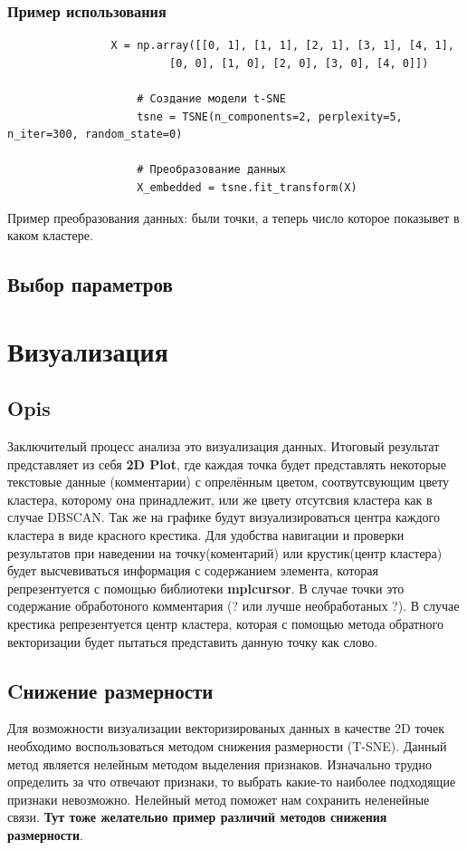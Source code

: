 		\subsubsection{Пример использования}
			\begin{verbatim}
				X = np.array([[0, 1], [1, 1], [2, 1], [3, 1], [4, 1],
             			 [0, 0], [1, 0], [2, 0], [3, 0], [4, 0]])

					# Создание модели t-SNE
					tsne = TSNE(n_components=2, perplexity=5, n_iter=300, random_state=0)

					# Преобразование данных
					X_embedded = tsne.fit_transform(X)
			\end{verbatim}
			
			
			Пример преобразования данных:
				были точки, а теперь число которое показывет в каком кластере.
		
	\subsection{Выбор параметров}
			
	
	
\section{Визуализация}
	\subsection{Opis}
		Заключителый процесс анализа это визуализация данных. Итоговый результат представляет из себя \textbf{2D Plot}, где каждая точка будет представлять некоторые текстовые данные (комментарии) с опрелённым цветом, соотвутсвующим цвету кластера, которому она принадлежит, или же цвету отсутсвия кластера как в случае DBSCAN. Так же на графике будут визуализироваться центра каждого кластера в виде красного крестика. Для удобства навигации и проверки результатов  при наведении на точку(коментарий) или крустик(центр кластера) будет высчевиваться информация с содержанием элемента, которая репрезентуется с помощью библиотеки \textbf{mplcursor}. В случае точки это содержание обработоного комментария (? или лучше необработаных ?). В случае крестика репрезентуется центр кластера, которая с помощью метода обратного векторизации будет пытаться представить данную точку как слово.
	
	\subsection{Cнижение размерности}
		Для возможности визуализации векторизированых данных в качестве 2D точек необходимо воспользоваться методом снижения размерности (T-SNE). Данный метод является нелейным методом выделения признаков. Изначально трудно определить за что отвечают признаки, то выбрать какие-то наиболее подходящие признаки невозможно. Нелейный метод поможет нам сохранить неленейные связи. \textbf{Тут тоже желательно пример различий методов снижения размерности}.
		
